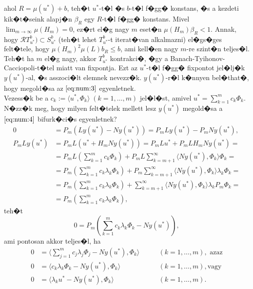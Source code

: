 ahol $R = \mu(u^*) + b$, teh�t $u^*$-t�l �s $b$-t�l f�gg� konstans, �s a kezdeti kik�t�seink alapj�n $\beta_R$ egy $R$-t�l f�gg� konstans. Mivel $\lim_{m \to \infty} \mu(H_m) = 0$, ez�rt el�g nagy $m$ eset�n $\mu(H_m) \beta_R < 1$. Annak, hogy $\mathcal{R}T_{u^*}^b) \subset S_{u^*}^b$ (teh�t lehet $ T_{u^*}^b$-t iterat�van alkalmazni) el�gs�ges felt�tele, hogy $\mu(H_m)^2 \mu(L) b_R \leq b$, ami kell�en nagy $m$-re szint�n teljes�l. Teh�t ha $m$ el�g nagy, akkor $ T_{u^*}^b$ kontrakci�, �gy a Banach-Tyihonov-Cacciopoli-t�tel miatt van fixpontja. Ezt az $u^*$-t�l f�gg� fixpontot jel�lj�k $y(u^*)$-al, �s asszoci�lt elemnek nevezz�k. $y(u^*)$-r�l k�nnyen bel�that�, hogy megold�sa az $\eqref{eq:num:3}$ egyenletnek. \\ %
Vezess�k be a $c_k := \langle u^*, \Phi_k \rangle \;(k = 1, \dots, m)$ jel�l�st, amivel $u^* = \sum_{k = 1}^m c_k \Phi_k$. N�zz�k meg, hogy milyen felt�telek mellett lesz $y(u^*)$ megold�sa a $\eqref{eq:num:4}$ bifurk�ci�s egyenletnek?
\begin{align*}
0 &= P_m(L y(u^*) - N y(u^*)) = P_m L y(u^*) - P_m N y(u^*), \\
P_m L y(u^*) &= P_m L (u^* + H_m N y(u^*)) = P_m L u^* + P_m L H_m N y(u^*) = \\
 &= P_m L (\sum_{k = 1}^m c_k\Phi_k) + P_m L \sum_{k = m+1}^\infty \langle N y(u^*), \Phi_k \rangle \Phi_k = \\
 &= P_m (\sum_{k = 1}^m c_k \lambda_k \Phi_k) + P_m \sum_{k = m + 1}^\infty \langle N y(u^*), \Phi_k \rangle \lambda_k \Phi_k = \\
 &= P_m (\sum_{k = 1}^m c_k \lambda_k \Phi_k) + \sum_{k = m + 1}^\infty \langle N y(u^*), \Phi_k \rangle \lambda_k P_m \Phi_k = \\
 &= P_m (\sum_{k = 1}^m c_k \lambda_k \Phi_k),
\end{align*}
teh�t
\begin{equation*}
0 = P_m (\sum_{k = 1}^m c_k \lambda_k \Phi_k - N y(u^*)),
\end{equation*}
ami pontosan akkor teljes�l, ha
\begin{align}
0 &= \langle \sum_{j = 1}^m c_j \lambda_j \Phi_j - N y(u^*), \Phi_k \rangle \qquad &(k = 1, \dots, m), \text{ azaz} \nonumber \\
0 &= \langle c_k \lambda_k \Phi_k - N y(u^*), \Phi_k \rangle \qquad &(k = 1, \dots, m), \text{vagy} \nonumber \\
0 &= \langle \lambda_k u^* - N y(u^*), \Phi_k \rangle \qquad &(k = 1, \dots, m). \label{eq:num:5}
\end{align}
